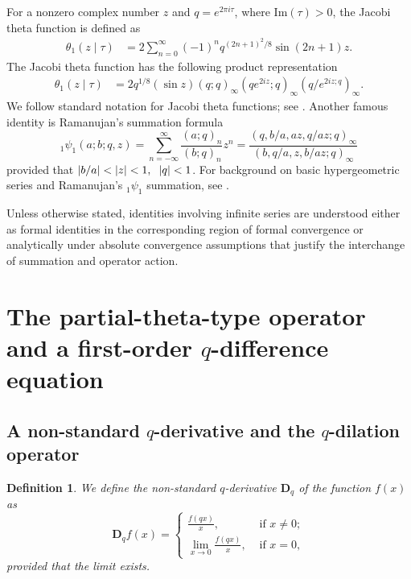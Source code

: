\documentclass[12pt]{article}
\newtheorem{definition}{Definition}
\begin{document}
For a nonzero complex number $z$ and $q=e^{2\pi i\tau}$, where $\mathrm{Im}(\tau)>0$, the Jacobi theta function is defined as
\begin{align}
    \theta_1(z\mid \tau)&=2\sum_{n=0}^{\infty}(-1)^nq^{(2n+1)^2/8}\sin(2n+1)z.\label{theta2}
\end{align}
The Jacobi theta function has the following product representation 
\begin{align}
    \theta_1(z\mid \tau)&=2q^{1/8}(\sin z)(q;q)_\infty(qe^{2iz};q)_\infty(q/e^{2iz;q})_\infty.\label{theta_prod2}
\end{align}
We follow standard notation for Jacobi theta functions; see
\cite{WhittakerWatson,AdigaBerndtBhargavaWatson1985}.
Another famous identity is Ramanujan's summation formula
\begin{equation}\label{eqn_ramanujan}
    {}_{1}\psi_{1}(a;b;q,z)=\sum_{n=-\infty}^{\infty}\frac{(a;q)_{n}}{(b;q)_{n}}z^n=\frac{(q,b/a,az,q/az;q)_{\infty}}{(b,q/a,z,b/az;q)_{\infty}}
\end{equation}
provided that $\vert b/a\vert<\vert z\vert<1,\hspace{0.2cm}\vert q\vert<1$. For background on basic hypergeometric series and Ramanujan's \({}_1\psi_1\) summation, see \cite{GasperRahman,Andrews1986}.

Unless otherwise stated, identities involving infinite series are understood either as formal identities in the corresponding region of formal convergence or analytically under absolute convergence assumptions that justify the interchange of summation and operator action.

\section{The partial-theta-type operator and a first-order $q$-difference equation}\label{sec3}

\subsection{A non-standard $q$-derivative and the $q$-dilation operator}

\begin{definition}
We define the non-standard $q$-derivative $\mathbf{D}_{q}$ of the function $f(x)$ as
\begin{equation}
    \mathbf{D}_{q}f(x)=
    \begin{cases}
    \frac{f(q x)}{x},&\text{ if }x\neq0;\\
    \lim_{x\rightarrow0}\frac{f(q x)}{x},&\text{ if }x=0,
    \end{cases}
\end{equation}    
provided that the limit exists.
\end{definition}
\end{document}
